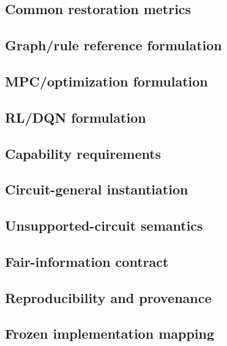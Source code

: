 \subsection{Common restoration metrics}
\subsection{Graph/rule reference formulation}
\subsection{MPC/optimization formulation}
\subsection{RL/DQN formulation}
\subsection{Capability requirements}
\subsection{Circuit-general instantiation}
\subsection{Unsupported-circuit semantics}
\subsection{Fair-information contract}
\subsection{Reproducibility and provenance}
\subsection{Frozen implementation mapping}
